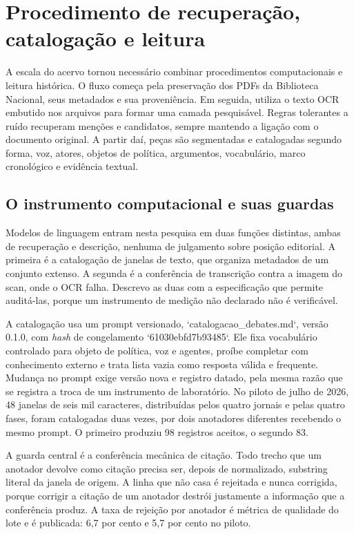 \section{Procedimento de recuperação, catalogação e leitura}

A escala do acervo tornou necessário combinar procedimentos computacionais e leitura histórica. O fluxo começa pela preservação dos PDFs da Biblioteca Nacional, seus metadados e sua proveniência. Em seguida, utiliza o texto OCR embutido nos arquivos para formar uma camada pesquisável. Regras tolerantes a ruído recuperam menções e candidatos, sempre mantendo a ligação com o documento original. A partir daí, peças são segmentadas e catalogadas segundo forma, voz, atores, objetos de política, argumentos, vocabulário, marco cronológico e evidência textual.

\subsection{O instrumento computacional e suas guardas}

Modelos de linguagem entram nesta pesquisa em duas funções distintas, ambas de recuperação e descrição, nenhuma de julgamento sobre posição editorial. A primeira é a catalogação de janelas de texto, que organiza metadados de um conjunto extenso. A segunda é a conferência de transcrição contra a imagem do scan, onde o OCR falha. Descrevo as duas com a especificação que permite auditá-las, porque um instrumento de medição não declarado não é verificável.

A catalogação usa um prompt versionado, `catalogacao\_debates.md`, versão 0.1.0, com \textit{hash} de congelamento `61030ebfd7b93485`. Ele fixa vocabulário controlado para objeto de política, voz e agentes, proíbe completar com conhecimento externo e trata lista vazia como resposta válida e frequente. Mudança no prompt exige versão nova e registro datado, pela mesma razão que se registra a troca de um instrumento de laboratório. No piloto de julho de 2026, 48 janelas de seis mil caracteres, distribuídas pelos quatro jornais e pelas quatro fases, foram catalogadas duas vezes, por dois anotadores diferentes recebendo o mesmo prompt. O primeiro produziu 98 registros aceitos, o segundo 83.

A guarda central é a conferência mecânica de citação. Todo trecho que um anotador devolve como citação precisa ser, depois de normalizado, substring literal da janela de origem. A linha que não casa é rejeitada e nunca corrigida, porque corrigir a citação de um anotador destrói justamente a informação que a conferência produz. A taxa de rejeição por anotador é métrica de qualidade do lote e é publicada: 6,7 por cento e 5,7 por cento no piloto.

